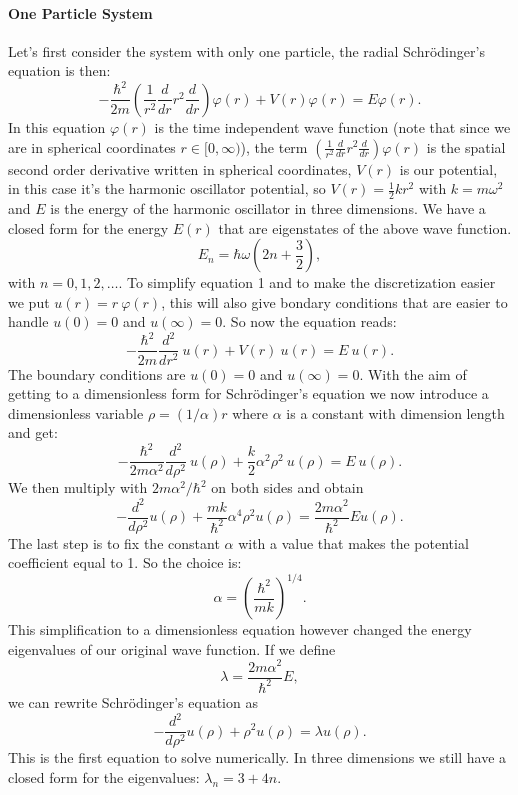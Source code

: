\documentclass[10pt,a4paper,titlepage]{article}
\begin{document}
\paragraph*{One Particle System}
Let's first consider the system with only one particle, the radial Schr\"odinger's equation is then:
\begin{equation}
	-\frac{\hbar^2}{2 m} \left ( \frac{1}{r^2} \frac{d}{dr} r^2
  \frac{d}{dr} \right )\varphi(r) 
     + V(r) \varphi(r) = E \varphi(r).
\end{equation}
In this equation $\varphi (r)$ is the time independent wave function (note that since we are in spherical coordinates $r\in [0,\infty)$), 
the term $ \left (  \frac{1}{r^2} \frac{d}{dr} r^2 \frac{d}{dr} \right )\varphi(r) $ is the spatial second order derivative written in 
spherical coordinates, $V(r)$ is our potential, in this case it's the harmonic oscillator potential, so  $V(r) = \frac{1}{2}kr^2$ with $k=m\omega^2$ and 
$E$ is the energy of the harmonic oscillator in three dimensions. We have a closed form for the energy $E(r)$ that are eigenstates of the above wave 
function.
\[
E_{n}=  \hbar \omega \left(2n+\frac{3}{2}\right),
\]
\noindent with $n=0,1,2,\dots$. To simplify equation 1 and to make the discretization easier we put $u(r) = r~\varphi (r)$, this will also give bondary 
conditions that are easier to handle $u(0)=0$ and $u(\infty)=0$. So now the equation reads:
\begin{equation}
  -\frac{\hbar^2}{2 m} \frac{d^2}{dr^2}~u(r) + V(r)~u(r)  = E~u(r) .
\end{equation}
The boundary conditions are $u(0)=0$ and $u(\infty)=0$.
With the aim of getting to a dimensionless form for Schr\"odinger's equation we now introduce a dimensionless variable $\rho = (1/\alpha) r$ where 
$\alpha$ is a constant with dimension length and get:
\begin{equation}
  -\frac{\hbar^2}{2 m \alpha^2} \frac{d^2}{d\rho^2}~u(\rho) 
       + \frac{k}{2} \alpha^2\rho^2 ~ u(\rho)  = E~u(\rho) .
\end{equation}
We then multiply with $2m\alpha^2/\hbar^2$ on both sides and obtain
\begin{equation}
  -\frac{d^2}{d\rho^2} u(\rho) 
       + \frac{mk}{\hbar^2} \alpha^4\rho^2u(\rho)  = \frac{2m\alpha^2}{\hbar^2}E u(\rho) .
\end{equation}
The last step is to fix the constant $\alpha$ with a value that makes the potential coefficient equal to 1. So the choice is:
\[
\alpha = \left(\frac{\hbar^2}{mk}\right)^{1/4}.
\]
This simplification to a dimensionless equation however changed the energy eigenvalues of our original wave function. If we define 
\[
\lambda = \frac{2m\alpha^2}{\hbar^2}E,
\]
we can rewrite Schr\"odinger's equation as
\begin{equation}
  -\frac{d^2}{d\rho^2} u(\rho) + \rho^2u(\rho)  = \lambda u(\rho) .
\end{equation}
This is the first equation to solve numerically. In three dimensions we still have a closed form for the eigenvalues:
$\lambda_n = 3 + 4n$.
\end{document}
